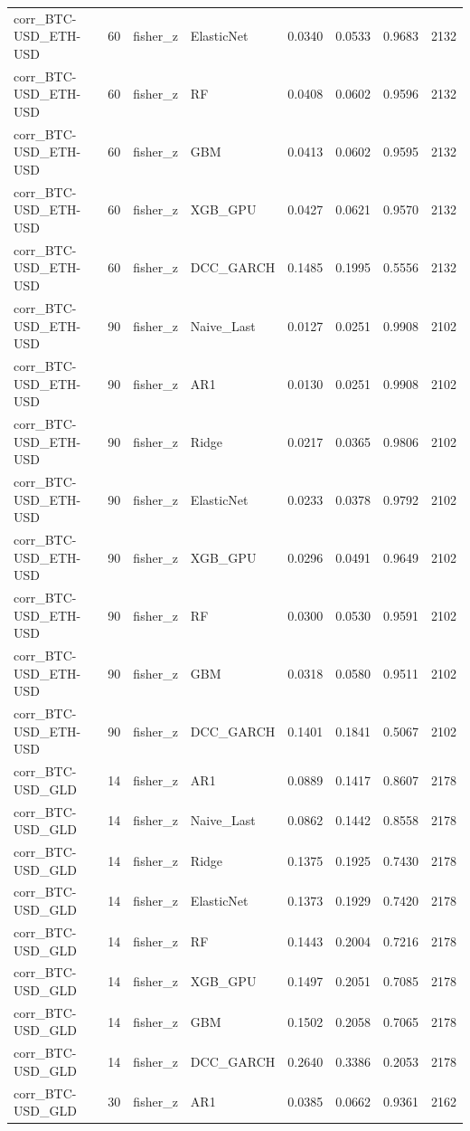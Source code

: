 \begin{table}[H]
\begin{tabular}{llllrrrr}
corr_BTC-USD_ETH-USD & 60 & fisher_z & ElasticNet & 0.0340 & 0.0533 & 0.9683 & 2132 \\
corr_BTC-USD_ETH-USD & 60 & fisher_z & RF & 0.0408 & 0.0602 & 0.9596 & 2132 \\
corr_BTC-USD_ETH-USD & 60 & fisher_z & GBM & 0.0413 & 0.0602 & 0.9595 & 2132 \\
corr_BTC-USD_ETH-USD & 60 & fisher_z & XGB_GPU & 0.0427 & 0.0621 & 0.9570 & 2132 \\
corr_BTC-USD_ETH-USD & 60 & fisher_z & DCC_GARCH & 0.1485 & 0.1995 & 0.5556 & 2132 \\
corr_BTC-USD_ETH-USD & 90 & fisher_z & Naive_Last & 0.0127 & 0.0251 & 0.9908 & 2102 \\
corr_BTC-USD_ETH-USD & 90 & fisher_z & AR1 & 0.0130 & 0.0251 & 0.9908 & 2102 \\
corr_BTC-USD_ETH-USD & 90 & fisher_z & Ridge & 0.0217 & 0.0365 & 0.9806 & 2102 \\
corr_BTC-USD_ETH-USD & 90 & fisher_z & ElasticNet & 0.0233 & 0.0378 & 0.9792 & 2102 \\
corr_BTC-USD_ETH-USD & 90 & fisher_z & XGB_GPU & 0.0296 & 0.0491 & 0.9649 & 2102 \\
corr_BTC-USD_ETH-USD & 90 & fisher_z & RF & 0.0300 & 0.0530 & 0.9591 & 2102 \\
corr_BTC-USD_ETH-USD & 90 & fisher_z & GBM & 0.0318 & 0.0580 & 0.9511 & 2102 \\
corr_BTC-USD_ETH-USD & 90 & fisher_z & DCC_GARCH & 0.1401 & 0.1841 & 0.5067 & 2102 \\
corr_BTC-USD_GLD & 14 & fisher_z & AR1 & 0.0889 & 0.1417 & 0.8607 & 2178 \\
corr_BTC-USD_GLD & 14 & fisher_z & Naive_Last & 0.0862 & 0.1442 & 0.8558 & 2178 \\
corr_BTC-USD_GLD & 14 & fisher_z & Ridge & 0.1375 & 0.1925 & 0.7430 & 2178 \\
corr_BTC-USD_GLD & 14 & fisher_z & ElasticNet & 0.1373 & 0.1929 & 0.7420 & 2178 \\
corr_BTC-USD_GLD & 14 & fisher_z & RF & 0.1443 & 0.2004 & 0.7216 & 2178 \\
corr_BTC-USD_GLD & 14 & fisher_z & XGB_GPU & 0.1497 & 0.2051 & 0.7085 & 2178 \\
corr_BTC-USD_GLD & 14 & fisher_z & GBM & 0.1502 & 0.2058 & 0.7065 & 2178 \\
corr_BTC-USD_GLD & 14 & fisher_z & DCC_GARCH & 0.2640 & 0.3386 & 0.2053 & 2178 \\
corr_BTC-USD_GLD & 30 & fisher_z & AR1 & 0.0385 & 0.0662 & 0.9361 & 2162 \\

\end{tabular}
\end{table}
